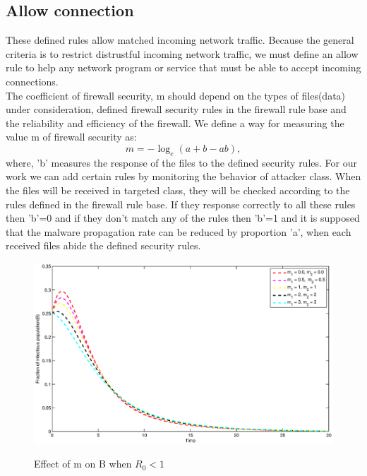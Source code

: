 \subsection{Allow connection}
        These defined rules allow matched incoming network traffic. Because the general criteria is to restrict distrustful incoming network traffic, we must define an allow rule to help any network program or service that must be able to accept incoming connections.\\
      The coefficient of firewall security, m should depend on the types of files(data) under consideration, defined firewall security rules in the firewall rule base and the reliability and efficiency of the firewall. We define a way for
          measuring the value m of firewall security as:
          $$m=-{\log_e (a+b-ab)},$$
          where, 'b' measures the response of the files to the defined security rules.
For our work we can add certain rules by monitoring the behavior of attacker class. When the files will be received in targeted class, they will be checked according to the rules defined in the firewall rule base. If they response correctly to all these rules then 'b'=0 and if they don't match any of the rules then 'b'=1 and it is supposed that the malware propagation rate can be reduced by proportion 'a', when each received files abide the defined security rules.
\newpage
\begin{figure}[h!]
  \includegraphics[width=7.5in]{mB1.eps}\\
  \caption{Effect of m on B when $R_0<1$}\label{fig:a2}
\end{figure}
